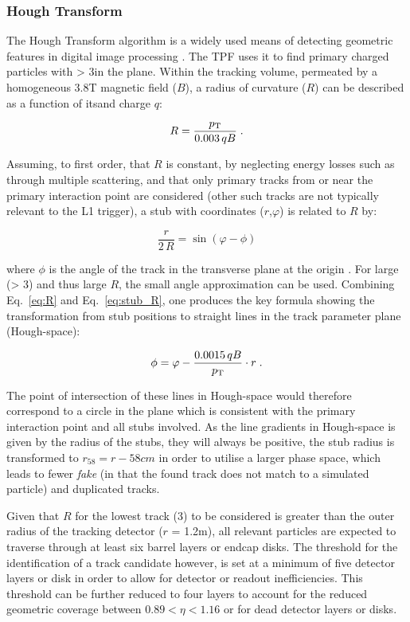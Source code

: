 \subsubsection{Hough Transform}
The Hough Transform algorithm is a widely used means of detecting geometric features in digital image processing \cite{HT}. 
The TPF uses it to find primary charged particles with \pT > 3\GeV in the \rphi plane. 
Within the tracking volume, permeated by a homogeneous 3.8T magnetic field ($B$), a radius of curvature ($R$) can be described as a function of its\pT and charge $q$:

\begin{equation}
R = \frac{p_{\mathrm{T}}}{0.003\,qB} \;.
\label{eq:R}
\end{equation}

Assuming, to first order, that $R$ is constant, by neglecting energy losses such as through multiple scattering, and that only primary tracks from or near the primary interaction point are considered (other such tracks are not typically relevant to the L1 trigger), a stub with coordinates ($r$,$\varphi$) is related to $R$ by:

\begin{equation}
\frac r{2\,R} = \sin\left(\varphi-\phi\right)
\label{eq:stub_R}
\end{equation}

where $\phi$ is the angle of the track in the transverse plane at the origin \cite{markthesis}. 
For large \pT (> 3\GeV) and thus large $R$, the small angle approximation can be used. Combining Eq.~\ref{eq:R} and Eq.~\ref{eq:stub_R}, one produces the key formula showing the transformation from stub positions to straight lines in the track parameter plane (Hough-space):

\begin{equation}
\phi = \varphi - \frac{0.0015\,qB}{p_{\mathrm{T}}}\cdot r \;.
\label{eq:localHT}
\end{equation}

The point of intersection of these lines in Hough-space would therefore correspond to a circle in the \rphi plane which is consistent with the primary interaction point and all stubs involved.
As the line gradients in Hough-space is given by the radius of the stubs, they will always be positive, the stub radius is transformed to $r_{58} = r - 58cm$ in order to utilise a larger phase space, which leads to fewer \textit{fake} (in that the found track does not match to a simulated particle) and duplicated tracks.

Given that $R$ for the lowest \pT track (3\GeV) to be considered is greater than the outer radius of the tracking detector ($r$ = 1.2m), all relevant particles are expected to traverse through at least six barrel layers or endcap disks. 
The threshold for the identification of a track candidate however, is set at a minimum of five detector layers or disk in order to allow for detector or readout inefficiencies. 
This threshold can be further reduced to four layers to account for the reduced geometric coverage between $0.89 < \eta < 1.16$ or for dead detector layers or disks.

